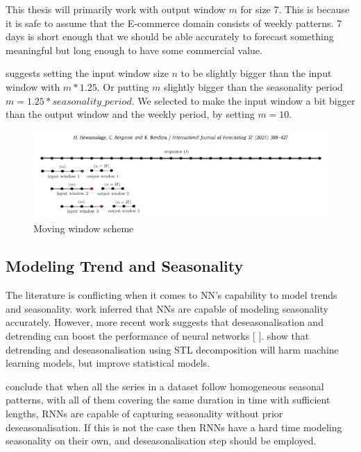 This thesis will primarily work with output window $m$ for size 7.
This is because it is safe to assume that the E-commerce domain consists of weekly patterns.
7 days is short enough that we should be able accurately to forecast something meaningful
but long enough to have some commercial value.

\cite{Hewamalage2021} suggests setting the input window size $n$ to be slightly
bigger than the input window with $m * 1.25$. Or putting $m$ slightly bigger than
the seasonality period $m = 1.25 * seasonality\_period$.
We selected to make the input window a bit bigger than the output window and the weekly
period, by setting $m = 10$.
\begin{figure}[h!]
  \centering
  \includegraphics[width=\textwidth]{./figs/illustrations/moving_window_illustration.png}
  \hfill
  \caption{Moving window scheme \citep{Hewamalage2021}}
  \label{fig:dataset:moving_window_scheme}
\end{figure}



\subsection{Modeling Trend and Seasonality}
\label{section:Data:Preprocessing:trend-and-seasonality}

The literature is conflicting when it comes to NN's capability to
model trends and seasonality. \cite{Sharda1992} work inferred that NNs are
capable of modeling seasonality accurately.
However, more recent work suggests that deseasonalisation and
detrending can boost the performance of neural networks [\cite{Zhang2005} \cite{Smyl2020}].
\cite{Ouyang2021} show that detrending and deseasonalisation using STL decomposition
will harm machine learning models, but improve statistical models.

\cite{Hewamalage2021} conclude that when all the series in a dataset follow
homogeneous seasonal patterns, with all of them covering the same duration in time
with sufficient lengths, RNNs are capable of capturing seasonality
without prior deseasonalisation.
If this is not the case then RNNs have a hard time modeling
seasonality on their own, and deseasonalisation step should be employed.

